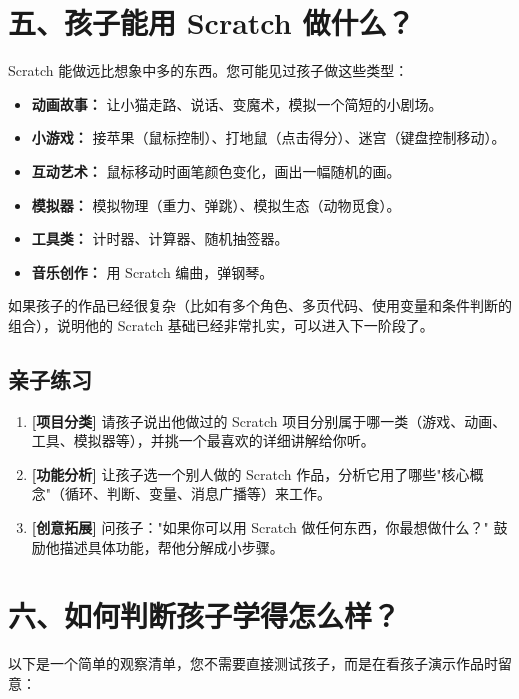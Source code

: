 \documentclass[a4paper,12pt]{ctexart}
\begin{document}
\section*{五、孩子能用 Scratch 做什么？}

Scratch 能做远比想象中多的东西。您可能见过孩子做这些类型：

\begin{itemize}
  \item \textbf{动画故事：} 让小猫走路、说话、变魔术，模拟一个简短的小剧场。
  \item \textbf{小游戏：} 接苹果（鼠标控制）、打地鼠（点击得分）、迷宫（键盘控制移动）。
  \item \textbf{互动艺术：} 鼠标移动时画笔颜色变化，画出一幅随机的画。
  \item \textbf{模拟器：} 模拟物理（重力、弹跳）、模拟生态（动物觅食）。
  \item \textbf{工具类：} 计时器、计算器、随机抽签器。
  \item \textbf{音乐创作：} 用 Scratch 编曲，弹钢琴。
\end{itemize}

如果孩子的作品已经很复杂（比如有多个角色、多页代码、使用变量和条件判断的组合），说明他的 Scratch 基础已经非常扎实，可以进入下一阶段了。

\subsection*{亲子练习}

\begin{enumerate}
  \item \textbf{[项目分类]} 请孩子说出他做过的 Scratch 项目分别属于哪一类（游戏、动画、工具、模拟器等），并挑一个最喜欢的详细讲解给你听。
  \item \textbf{[功能分析]} 让孩子选一个别人做的 Scratch 作品，分析它用了哪些"核心概念"（循环、判断、变量、消息广播等）来工作。
  \item \textbf{[创意拓展]} 问孩子："如果你可以用 Scratch 做任何东西，你最想做什么？" 鼓励他描述具体功能，帮他分解成小步骤。
\end{enumerate}

\section*{六、如何判断孩子学得怎么样？}

以下是一个简单的观察清单，您不需要直接测试孩子，而是在看孩子演示作品时留意：
\end{document}
